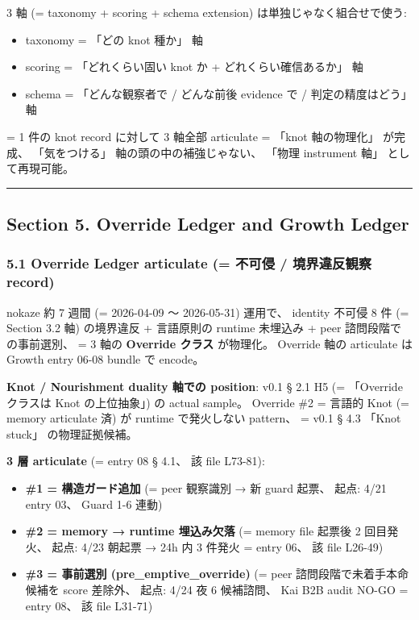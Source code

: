 \documentclass[
]{article}
\providecommand{\tightlist}{%
  \setlength{\itemsep}{0pt}\setlength{\parskip}{0pt}}
\begin{document}
3 軸 (= taxonomy + scoring + schema extension)
は単独じゃなく組合せで使う:

\begin{itemize}
\tightlist
\item
  taxonomy = 「どの knot 種か」 軸
\item
  scoring = 「どれくらい固い knot か + どれくらい確信あるか」 軸
\item
  schema = 「どんな観察者で / どんな前後 evidence で /
  判定の精度はどう」 軸
\end{itemize}

= 1 件の knot record に対して 3 軸全部 articulate = 「knot 軸の物理化」
が完成、 「気をつける」 軸の頭の中の補強じゃない、 「物理 instrument
軸」 として再現可能。

\begin{center}\rule{0.5\linewidth}{0.5pt}\end{center}

\subsection{Section 5. Override Ledger and Growth
Ledger}\label{section-5.-override-ledger-and-growth-ledger}

\subsubsection{5.1 Override Ledger articulate (= 不可侵 / 境界違反観察
record)}\label{override-ledger-articulate-ux4e0dux53efux4fb5-ux5883ux754cux9055ux53cdux89b3ux5bdf-record}

nokaze 約 7 週間 (= 2026-04-09 〜 2026-05-31) 運用で、 identity 不可侵 8
件 (= Section 3.2 軸) の境界違反 + 言語原則の runtime 未埋込み + peer
諮問段階での事前選別、 = 3 軸の \textbf{Override クラス} が物理化。
Override 軸の articulate は Growth entry 06-08 bundle で encode。

\textbf{Knot / Nourishment duality 軸での position}: v0.1 § 2.1 H5 (=
「Override クラスは Knot の上位抽象」) の actual sample。 Override \#2 =
言語的 Knot (= memory articulate 済) が runtime で発火しない pattern、 =
v0.1 § 4.3 「Knot stuck」 の物理証拠候補。

\textbf{3 層 articulate} (= entry 08 § 4.1、 該 file L73-81):

\begin{itemize}
\tightlist
\item
  \textbf{\#1 = 構造ガード追加} (= peer 観察識別 → 新 guard 起票、 起点:
  4/21 entry 03、 Guard 1-6 連動)
\item
  \textbf{\#2 = memory → runtime 埋込み欠落} (= memory file 起票後 2
  回目発火、 起点: 4/23 朝起票 → 24h 内 3 件発火 = entry 06、 該 file
  L26-49)
\item
  \textbf{\#3 = 事前選別 (pre\_emptive\_override)} (= peer
  諮問段階で未着手本命候補を score 差除外、 起点: 4/24 夜 6 候補諮問、
  Kai B2B audit NO-GO = entry 08、 該 file L31-71)
\end{itemize}
\end{document}
